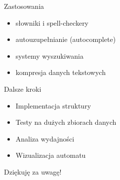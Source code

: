 \documentclass{beamer}
\begin{document}
\begin{frame}{Zastosowania}
    \begin{itemize}
        \item słowniki i spell-checkery
        \item autouzupełnianie (autocomplete)
        \item systemy wyszukiwania
        \item kompresja danych tekstowych
    \end{itemize}
\end{frame}


\begin{frame}{Dalsze kroki}
    \begin{itemize}
        \item Implementacja struktury
        \item Testy na dużych zbiorach danych
        \item Analiza wydajności
        \item Wizualizacja automatu
    \end{itemize}
\end{frame}

\begin{frame}
    \begin{center}
        \Huge Dziękuję za uwagę!
    \end{center}
\end{frame}

\frame{\titlepage}
\end{document}
